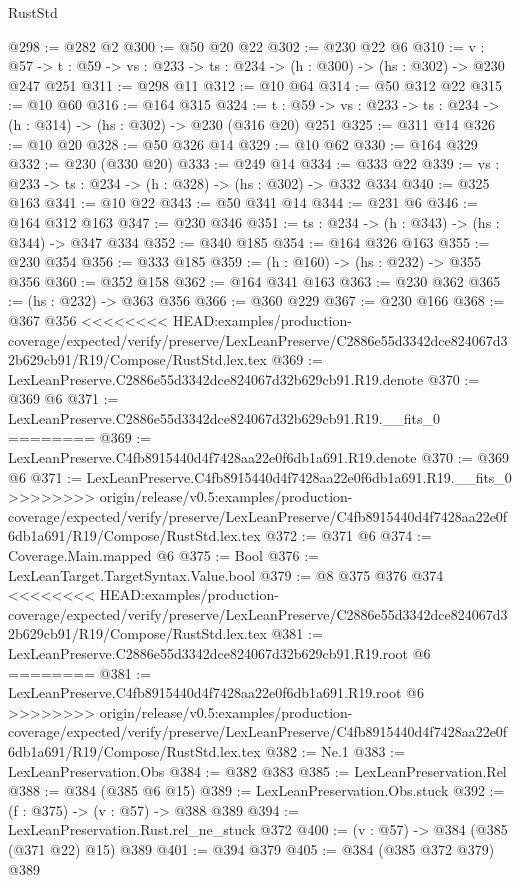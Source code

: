 \begin{lexlean}{RustStd}
\begin{coremodule}
{\begin{coremodule}
@298 := @282 @2
@300 := @50 @20 @22
@302 := @230 @22 @6
@310 := {v : @57} ->
  {t : @59} -> {vs : @233} -> {ts : @234} -> (h : @300) -> (hs : @302) -> @230 @247 @251
@311 := @298 @11
@312 := @10 @64
@314 := @50 @312 @22
@315 := @10 @60
@316 := @164 @315
@324 := {t : @59} -> {vs : @233} -> {ts : @234} -> (h : @314) -> (hs : @302) -> @230 (@316 @20) @251
@325 := @311 @14
@326 := @10 @20
@328 := @50 @326 @14
@329 := @10 @62
@330 := @164 @329
@332 := @230 (@330 @20)
@333 := @249 @14
@334 := @333 @22
@339 := {vs : @233} -> {ts : @234} -> (h : @328) -> (hs : @302) -> @332 @334
@340 := @325 @163
@341 := @10 @22
@343 := @50 @341 @14
@344 := @231 @6
@346 := @164 @312 @163
@347 := @230 @346
@351 := {ts : @234} -> (h : @343) -> (hs : @344) -> @347 @334
@352 := @340 @185
@354 := @164 @326 @163
@355 := @230 @354
@356 := @333 @185
@359 := (h : @160) -> (hs : @232) -> @355 @356
@360 := @352 @158
@362 := @164 @341 @163
@363 := @230 @362
@365 := (hs : @232) -> @363 @356
@366 := @360 @229
@367 := @230 @166
@368 := @367 @356
<<<<<<<< HEAD:examples/production-coverage/expected/verify/preserve/LexLeanPreserve/C2886e55d3342dce824067d32b629cb91/R19/Compose/RustStd.lex.tex
@369 := LexLeanPreserve.C2886e55d3342dce824067d32b629cb91.R19.denote
@370 := @369 @6
@371 := LexLeanPreserve.C2886e55d3342dce824067d32b629cb91.R19.__fits_0
========
@369 := LexLeanPreserve.C4fb8915440d4f7428aa22e0f6db1a691.R19.denote
@370 := @369 @6
@371 := LexLeanPreserve.C4fb8915440d4f7428aa22e0f6db1a691.R19.__fits_0
>>>>>>>> origin/release/v0.5:examples/production-coverage/expected/verify/preserve/LexLeanPreserve/C4fb8915440d4f7428aa22e0f6db1a691/R19/Compose/RustStd.lex.tex
@372 := @371 @6
@374 := Coverage.Main.mapped @6
@375 := Bool
@376 := LexLeanTarget.TargetSyntax.Value.bool
@379 := @8 @375 @376 @374
<<<<<<<< HEAD:examples/production-coverage/expected/verify/preserve/LexLeanPreserve/C2886e55d3342dce824067d32b629cb91/R19/Compose/RustStd.lex.tex
@381 := LexLeanPreserve.C2886e55d3342dce824067d32b629cb91.R19.root @6
========
@381 := LexLeanPreserve.C4fb8915440d4f7428aa22e0f6db1a691.R19.root @6
>>>>>>>> origin/release/v0.5:examples/production-coverage/expected/verify/preserve/LexLeanPreserve/C4fb8915440d4f7428aa22e0f6db1a691/R19/Compose/RustStd.lex.tex
@382 := Ne.{1}
@383 := LexLeanPreservation.Obs
@384 := @382 @383
@385 := LexLeanPreservation.Rel
@388 := @384 (@385 @6 @15)
@389 := LexLeanPreservation.Obs.stuck
@392 := (f : @375) -> (v : @57) -> @388 @389
@394 := LexLeanPreservation.Rust.rel_ne_stuck @372
@400 := (v : @57) -> @384 (@385 (@371 @22) @15) @389
@401 := @394 @379
@405 := @384 (@385 @372 @379) @389

\end{coremodule}}
\end{coremodule}
\end{lexlean}
